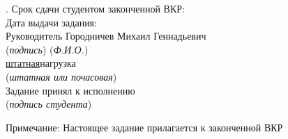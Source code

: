 {\begin{tabular}{@{}p{}p{}p{}@{}}
\end{tabular}

\vspace{1.5em}

. Срок сдачи студентом законченной ВКР: \hrulefill\\
 \hspace{1em}Дата выдачи задания: \hrulefill\\
 \hspace{1em}Руководитель\underline{\hspace{7cm}} \hspace{1em}Городничев Михаил Геннадьевич\\
 \hspace*{5cm}(\textit{подпись}) \hspace{5cm}(\textit{Ф.И.О.})\\
 \noindent \underline{\hspace{7cm}}\underline{штатная}\underline{\hspace{6cm}}нагрузка\\
\hspace*{5cm}(\textit{штатная или почасовая})\\

\noindent Задание принял к исполнению\underline{\hspace{11cm}}\\
\hspace*{9cm}(\textit{подпись студента})\\
\begin{center}
    Примечание: Настоящее задание прилагается к законченной ВКР
\end{center}
}
\thispagestyle{empty}
\clearpage